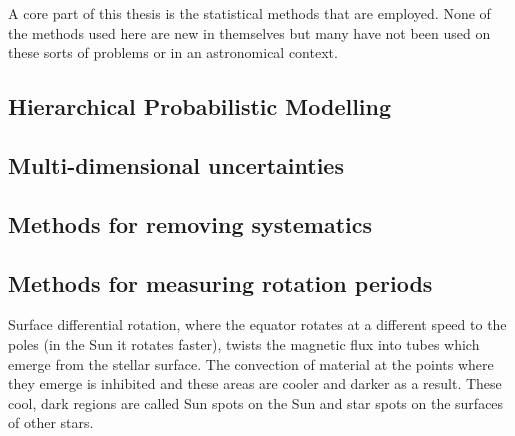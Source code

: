 A core part of this thesis is the statistical methods that are employed.
None of the methods used here are new in themselves but many have not been
used on these sorts of problems or in an astronomical context.

\subsection*{Hierarchical Probabilistic Modelling}
\subsection*{Multi-dimensional uncertainties}
\subsection*{Methods for removing systematics}
\subsection*{Methods for measuring rotation periods}

Surface differential rotation, where the equator rotates at a different speed
to the poles (in the Sun it rotates faster), twists the magnetic flux into
tubes which emerge from the stellar surface.
The convection of material at the points where they emerge is inhibited and
these areas are cooler and darker as a result.
These cool, dark regions are called Sun spots on the Sun and star spots on the
surfaces of other stars.

